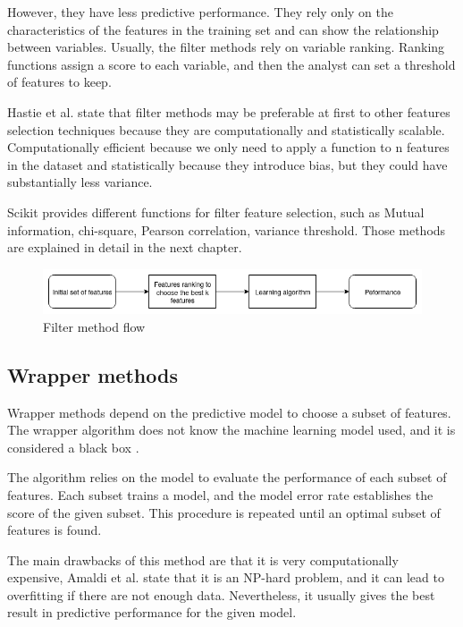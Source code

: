 However, they have less predictive performance.  They rely only on the characteristics of the features in the training set and can show the relationship between variables. \cite{sanchez2007filter}
Usually, the filter methods rely on variable ranking. Ranking functions assign a score to each variable, and then the analyst can set a threshold of features to keep. 

Hastie et al. \cite{hastie2009elements} state that filter methods may be preferable at first to other features selection techniques because they are computationally and statistically scalable.  Computationally efficient because we only need to apply a function to n features in the dataset and statistically because they introduce bias, but they could have substantially less variance.

Scikit provides different functions for filter feature selection, such as Mutual information, chi-square, Pearson correlation, variance threshold. Those methods are explained in detail in the next chapter.

\begin{figure}[!h]
	\centering
	\includegraphics[width=1.0\columnwidth]{filter}
	\caption{Filter method flow}
	\label{fig:filter}
\end{figure}


\subsection{Wrapper methods}

Wrapper methods depend on the predictive model to choose a subset of features. The wrapper algorithm does not know the machine learning model used, and it is considered a black box \cite{kohavi1997wrappers}. 

The algorithm relies on the model to evaluate the performance of each subset of features. Each subset trains a model, and the model error rate establishes the score of the given subset. This procedure is repeated until an optimal subset of features is found. 

The main drawbacks of this method are that it is very computationally expensive, Amaldi et al. \cite{amaldi1998approximability} state that it is an NP-hard problem, and it can lead to overfitting if there are not enough data. Nevertheless, it usually gives the best result in predictive performance for the given model. \\

